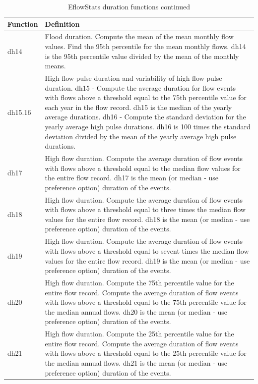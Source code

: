 \documentclass[a4paper,11pt]{article}\usepackage[]{graphicx}\usepackage[]{color}
\begin{document}
\begin{table}[ht]
  \centering
  \begin{threeparttable}[b]
  \caption{EflowStats duration functions continued}
  \label{tab:dur3Stats}
  \begin{tabularx}{\textwidth}{|l|X|}
  \hline
\textbf{Function} & \textbf{Definition} \\ 
  \hline
  dh14 & Flood duration. Compute the mean of the mean monthly flow values. Find the 95th percentile for the mean monthly flows. dh14 is the 95th percentile value divided by the mean of the monthly means. \\
  dh15.16 & High flow pulse duration and variability of high flow pulse duration. dh15 - Compute the average duration for flow events with flows above a threshold equal to the 75th percentile value for each year in the flow record. dh15 is the median of the yearly average durations. dh16 - Compute the standard deviation for the yearly average high pulse durations. dh16 is 100 times the standard deviation divided by the mean of the yearly average high pulse durations. \\
  dh17 & High flow duration. Compute the average duration of flow events with flows above a threshold equal to the median flow values for the entire flow record. dh17 is the mean (or median - use preference option) duration of the events. \\
  dh18 & High flow duration. Compute the average duration of flow events with flows above a threshold equal to three times the median flow values for the entire flow record. dh18 is the mean (or median - use preference option) duration of the events. \\
  dh19 & High flow duration. Compute the average duration of flow events with flows above a threshold equal to sevent times the median flow values for the entire flow record. dh19 is the mean (or median - use preference option) duration of the events. \\
  dh20 & High flow duration. Compute the 75th percentile value for the entire flow record. Compute the average duration of flow events with flows above a threshold equal to the 75th percentile value for the median annual flows. dh20 is the mean (or median - use preference option) duration of the events. \\
  dh21 & High flow duration. Compute the 25th percentile value for the entire flow record. Compute the average duration of flow events with flows above a threshold equal to the 25th percentile value for the median annual flows. dh21 is the mean (or median - use preference option) duration of the events. \\

\end{tabularx}
\end{threeparttable}
\end{table}
\end{document}
